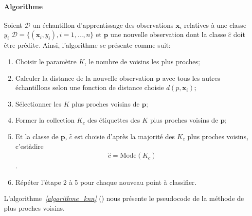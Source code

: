 \documentclass[letterpaper,11pt,english]{sphinxmanual}
\begin{document}
\paragraph{Algorithme}
\label{\detokenize{chapter3:algorithme}}
\sphinxAtStartPar
Soient \(\mathcal{D}\) un échantillon d’apprentissage des
observations \(\mathbf{x}_i\) relatives à une classe \(y_i\)
\(\mathcal{D}=\{(\mathbf{x}_i, y_i), i=1, \dots,n\}\) et
\(\textbf{p}\) une nouvelle observation dont la classe
\(\hat{c}\) doit être prédite. 
Ainsi, l’algorithme se présente comme suit:
\begin{enumerate}
%
\item {} 
\sphinxAtStartPar
Choisir le paramètre \(K\), le nombre de voisins les plus
proches;

\item {} 
\sphinxAtStartPar
Calculer la distance de la nouvelle observation \(\textbf{p}\)
avec tous les autres échantillons selon une fonction de distance
choisie \(d(p, \mathbf{x}_i);\)

\item {} 
\sphinxAtStartPar
Sélectionner les \(K\) plus proches voisins de
\(\textbf{p}\);

\item {} 
\sphinxAtStartPar
Former la collection \(K_c\) des étiquettes des \(K\) plus
proches voisins de \(\textbf{p}\);

\item {} 
\sphinxAtStartPar
Et la classe de \(\textbf{p}\), \(\hat{c}\) est choisie
d’après la majorité des \(K_c\) plus proches voisins,
c’est\sphinxhyphen{}à\sphinxhyphen{}dire
\begin{equation}\label{equation:chapter3:chapter3:23}
\begin{split}\hat{c}=\mbox{Mode}(K_c)\end{split}
\end{equation}
\sphinxAtStartPar
.

\item {} 
\sphinxAtStartPar
Répéter l’étape 2 à 5 pour chaque nouveau point à classifier.

\end{enumerate}

\sphinxAtStartPar
L’algorithme {\hyperref[\detokenize{chapter3:algorithme_knn}]{\emph{{[}algorithme\_knn{]}}}} () nous présente le
pseudo\sphinxhyphen{}code de la méthode de plus proches voisins.
\end{document}
